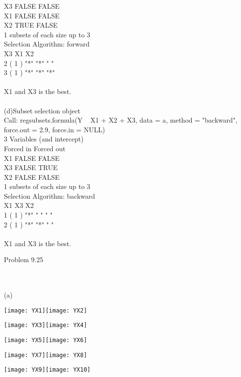 \documentclass{article}
\begin{document}
X3     FALSE      FALSE\\
X1     FALSE      FALSE\\
X2      TRUE      FALSE\\
1 subsets of each size up to 3\\
Selection Algorithm: forward\\
         X3  X1  X2 \\
2  ( 1 ) "*" "*" " "\\
3  ( 1 ) "*" "*" "*"\\\\
X1 and X3 is the best.
\\\\(d)Subset selection object\\
Call: regsubsets.formula(Y ~ X1 + X2 + X3, data = a, method = "backward", 
    force.out = 2.9, force.in = NULL)\\
3 Variables  (and intercept)\\
   Forced in Forced out\\
X1     FALSE      FALSE\\
X3     FALSE       TRUE\\
X2     FALSE      FALSE\\
1 subsets of each size up to 3\\
Selection Algorithm: backward\\
         X1  X3  X2 \\
1  ( 1 ) "*" " " " "\\
2  ( 1 ) "*" "*" " "\\\\
X1 and X3 is the best.
\begin{large}Problem 9.25\end{large}
\\\\(a)\begin{center}\texttt{[image: YX1]}\texttt{[image: YX2]}\end{center}\begin{center}\texttt{[image: YX3]}\texttt{[image: YX4]}\end{center}\begin{center}\texttt{[image: YX5]}\texttt{[image: YX6]}\end{center}\begin{center}\texttt{[image: YX7]}\texttt{[image: YX8]}\end{center}\begin{center}\texttt{[image: YX9]}\texttt{[image: YX10]}\end{center}
\end{document}

